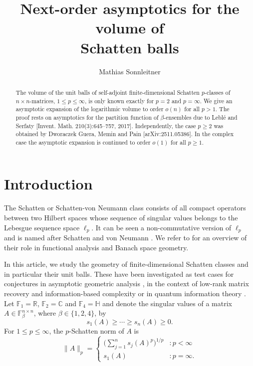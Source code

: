 \documentclass[a4paper,12pt,reqno]{amsart}
\title[Next-order asymptotics for the volume of Schatten balls]{Next-order asymptotics for the volume of \\ Schatten balls}
\author[M.~Sonnleitner]{Mathias Sonnleitner}
\theoremstyle{definition}
\newcommand{\IC}{\mathbb{C}}
\newcommand{\IR}{\mathbb{R}}
\begin{document}
\begin{abstract}
	The volume of the unit balls of self-adjoint finite-dimensional Schatten $p$-classes of $n\times n$-matrices, $1\le p\le \infty$, is only known exactly for $p=2$ and $p=\infty$. We give an asymptotic expansion of the logarithmic volume to order $o(n)$ for all $p>1$. The proof rests on asymptotics for the partition function of $\beta$-ensembles due to Lebl\'e and Serfaty [Invent. Math. 210(3):645--757, 2017]. Independently, the case $p\ge 2$ was obtained by Dworaczek Guera, Memin and Pain [arXiv:2511.05386]. In the complex case the asymptotic expansion is continued to order $o(1)$ for all $p\ge 1$. 
\end{abstract}

\maketitle

\section{Introduction}

The Schatten or Schatten-von Neumann class consists of all compact operators between two Hilbert spaces whose sequence of singular values belongs to the Lebesgue sequence space $\ell_p$. It can be seen a non-commutative version of $\ell_p$ and is named after Schatten and von Neumann \cite{Sch46,Sch50,SVN46}. We refer to \cite{Pie07,PX03} for an overview of their role in functional analysis and Banach space geometry.

In this article, we study the geometry of finite-dimensional Schatten classes and in particular their unit balls. These have been investigated as test cases for conjectures in asymptotic geometric analysis \cite{DFG+23,GMP25,GP07,KMP98,RV20}, in the context of low-rank matrix recovery and information-based complexity \cite{CR12,CK15,HPV17,HPV21,PS22} or in quantum information theory \cite{ASW11,Wil13}. Let $\mathbb{F}_1=\IR$, $\mathbb{F}_2=\IC$ and $\mathbb{F}_4=\mathbb{H}$ and denote the singular values of a matrix $A\in \mathbb{F}_{\beta}^{n\times n}$, where $\beta\in\{1,2,4\}$, by 
\[
s_1(A)\ge \cdots \ge s_n(A)\ge 0.
\] 
For $1\le p\le \infty$, the $p$-Schatten norm of $A$ is 
\[
\|A\|_p
=
\begin{cases}
	\Big(\sum_{j=1}^{n}s_j(A)^p\Big)^{1/p}&\colon p<\infty\\
	s_1(A) &\colon p=\infty.
\end{cases}
\]
\end{document}
